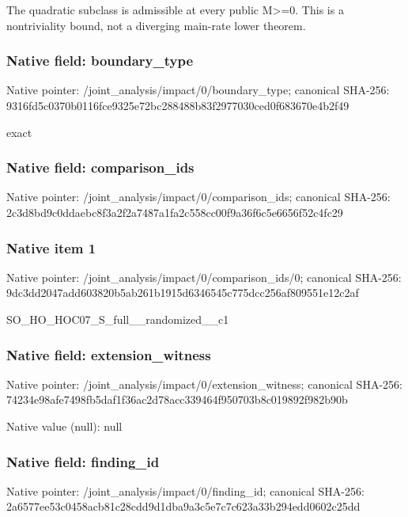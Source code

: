 \documentclass[10pt,a4paper]{article}
\begin{document}
\begingroup\raggedright\sloppy The quadratic subclass is admissible at every public M>=\allowbreak{}0. This is a nontriviality bound,\allowbreak{} not a diverging main-rate lower theorem.\par\endgroup

\subsubsection{Native field: boundary\_\allowbreak{}type}
Native pointer: /joint\_\allowbreak{}analysis/impact/0/boundary\_\allowbreak{}type; canonical SHA-256: 9316fd5c0370b0116fce9325e72bc288488b83f2977030ced0f683670e4b2f49

\begingroup\raggedright\sloppy exact\par\endgroup

\subsubsection{Native field: comparison\_\allowbreak{}ids}
Native pointer: /joint\_\allowbreak{}analysis/impact/0/comparison\_\allowbreak{}ids; canonical SHA-256: 2c3d8bd9c0ddaebc8f3a2f2a7487a1fa2c558cc00f9a36f6c5e6656f52c4fc29

\subsubsection{Native item 1}
Native pointer: /joint\_\allowbreak{}analysis/impact/0/comparison\_\allowbreak{}ids/0; canonical SHA-256: 9dc3dd2047add603820b5ab261b1915d6346545c775dcc256af809551e12c2af

\begingroup\raggedright\sloppy SO\_\allowbreak{}HO\_\allowbreak{}HOC07\_\allowbreak{}S\_\allowbreak{}full\_\allowbreak{}\_\allowbreak{}randomized\_\allowbreak{}\_\allowbreak{}c1\par\endgroup

\subsubsection{Native field: extension\_\allowbreak{}witness}
Native pointer: /joint\_\allowbreak{}analysis/impact/0/extension\_\allowbreak{}witness; canonical SHA-256: 74234e98afe7498fb5daf1f36ac2d78acc339464f950703b8c019892f982b90b

Native value (null): null

\subsubsection{Native field: finding\_\allowbreak{}id}
Native pointer: /joint\_\allowbreak{}analysis/impact/0/finding\_\allowbreak{}id; canonical SHA-256: 2a6577ee53c0458acb81c28cdd9d1dba9a3c5e7c7c623a33b294edd0602c25dd
\end{document}
